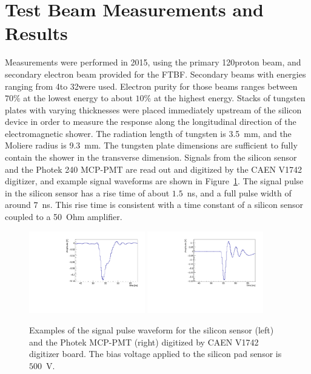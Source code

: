 \section{Test Beam Measurements and Results} \label{sec:results} 
Measurements were performed in 2015, using the primary 120\GeV proton
beam, and secondary electron
beam provided for the FTBF. Secondary beams with energies ranging from 4\GeV to 32\GeV were used. Electron purity for those beams ranges
between $70\%$ at the lowest energy to about $10\%$ at the highest energy.
Stacks of tungsten plates with varying thicknesses were placed immediately
upstream of the silicon device in order to measure the response along the
longitudinal direction of the electromagnetic shower. The radiation length of
tungsten is 3.5~mm, and the Moliere radius is 9.3~mm. The tungsten
plate dimensions are
sufficient to fully contain the shower in the transverse dimension. Signals from
the silicon sensor and the Photek 240 MCP-PMT are read out and digitized by the CAEN
V1742 digitizer, and example signal waveforms are shown in
Figure~\ref{fig:pulses}. The signal pulse in the silicon sensor has a rise time of
about $1.5$~ns, and a full pulse width of around $7$~ns. This rise time is
consistent with a time constant of a silicon sensor coupled to a 50~Ohm amplifier.

\begin{figure}[h] 
\centering
\includegraphics[width=0.45\textwidth]{plots/ExampleSiliconPadPulse_6X0_16GeV.pdf} 
\includegraphics[width=0.45\textwidth]{plots/ExamplePhotekPulse.pdf} 
\caption{Examples of the signal pulse waveform for the silicon sensor (left) and
the Photek MCP-PMT (right) digitized by CAEN V1742 digitizer board. The bias
voltage applied to the silicon pad sensor is~$500$~V.} 
\label{fig:pulses} 
\end{figure} 

